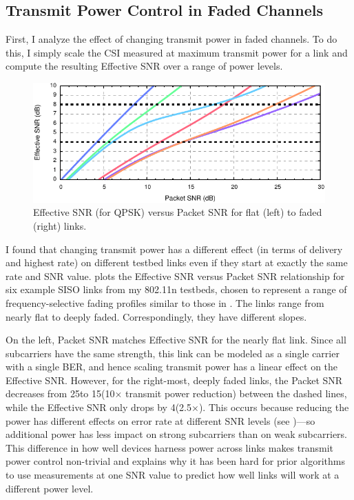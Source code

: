 \subsection{Transmit Power Control in Faded Channels}
First, I analyze the effect of changing transmit power in faded channels. To do this, I simply scale the CSI measured at maximum transmit power for a link and compute the resulting Effective SNR over a range of power levels.

\begin{figure}[t]
  \centering
  \includegraphics[width=\textwidth]{figures/eff_vs_snr_qpsk.pdf}
  \caption[Effective SNR vs Packet SNR for four faded links]{Effective SNR (for QPSK) versus Packet SNR for flat (left) to faded (right) links.}
  \label{fig:eff_vs_rssi}
\end{figure}

I found that changing transmit power has a different effect (in terms of delivery and highest rate) on different testbed links even if they start at exactly the same rate and SNR value.  plots the Effective SNR versus Packet SNR relationship for six example SISO links from my 802.11n testbeds, chosen to represent a range of frequency-selective fading profiles similar to those in . The links range from nearly flat to deeply faded. Correspondingly, they have different slopes.

On the left, Packet SNR matches Effective SNR for the nearly flat link. Since all subcarriers have the same strength, this link can be modeled as a single carrier with a single BER, and hence scaling transmit power has a linear effect on the Effective SNR. However, for the right-most, deeply faded links, the Packet SNR decreases from 25\dB to 15\dB (10$\times$ transmit power reduction) between the dashed lines, while the Effective SNR only drops by 4\dB (2.5$\times$). This occurs because reducing the power has different effects on error rate at different SNR levels (see )---so additional power has less impact on strong subcarriers than on weak subcarriers. This difference in how well devices harness power across links makes transmit power control non-trivial and explains why it has been hard for prior algorithms to use measurements at one SNR value to predict how well links will work at a different power level.

